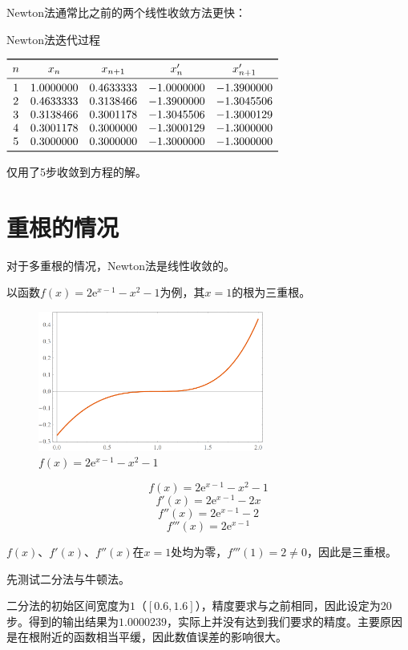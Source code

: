 \documentclass{ctexart}
\begin{document}
Newton法通常比之前的两个线性收敛方法更快：

\begin{table}[htpb]
\centering
\caption{Newton法迭代过程}
$\begin{array}{ccccc}
    \toprule
n & x_n & x_{n+1} & x'_n & x'_{n+1} \\
\midrule
 1 & 1.0000000 & 0.4633333 & -1.0000000 & -1.3900000 \\
 2 & 0.4633333 & 0.3138466 & -1.3900000 & -1.3045506 \\
 3 & 0.3138466 & 0.3001178 & -1.3045506 & -1.3000129 \\
 4 & 0.3001178 & 0.3000000 & -1.3000129 & -1.3000000 \\
 5 & 0.3000000 & 0.3000000 & -1.3000000 & -1.3000000 \\
    \bottomrule
\end{array}\label{table:newton}$
\end{table}

仅用了5步收敛到方程的解。

\section{重根的情况}
对于多重根的情况，Newton法是线性收敛的。

以函数$f(x) = 2\mathrm{e}^{x-1} - x^2 - 1$为例，其$x=1$的根为三重根。

\begin{figure}[htbp]
  \centering
  \includegraphics[width=20em]{plot6.png}
  \caption{$f(x) = 2\mathrm{e}^{x-1} - x^2 - 1$}
  \label{fig:plot6}
\end{figure}
\[
f(x) = 2\mathrm{e}^{x-1} - x^2 - 1
\]
\[
f'(x) = 2\mathrm{e}^{x-1} - 2x
\]
\[
f''(x) = 2\mathrm{e}^{x-1} - 2
\]
\[
f'''(x) = 2\mathrm{e}^{x-1}
\]

$f(x)$、$f'(x)$、$f''(x)$在$x=1$处均为零，$f'''(1)=2\neq0$，因此是三重根。

先测试二分法与牛顿法。

二分法的初始区间宽度为$1$（$[0.6,1.6]$），精度要求与之前相同，因此设定为20步。得到的输出结果为$1.0000239$，实际上并没有达到我们要求的精度。主要原因是在根附近的函数相当平缓，因此数值误差的影响很大。
\end{document}
